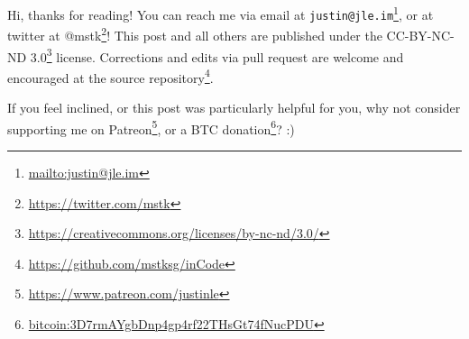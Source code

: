 \documentclass[]{article}
\renewcommand{\href}[2]{#2\footnote{\url{#1}}}
\begin{document}
Hi, thanks for reading! You can reach me via email at
\href{mailto:justin@jle.im}{\nolinkurl{justin@jle.im}}, or at twitter at
\href{https://twitter.com/mstk}{@mstk}! This post and all others are published
under the \href{https://creativecommons.org/licenses/by-nc-nd/3.0/}{CC-BY-NC-ND
3.0} license. Corrections and edits via pull request are welcome and encouraged
at \href{https://github.com/mstksg/inCode}{the source repository}.

If you feel inclined, or this post was particularly helpful for you, why not
consider \href{https://www.patreon.com/justinle}{supporting me on Patreon}, or a
\href{bitcoin:3D7rmAYgbDnp4gp4rf22THsGt74fNucPDU}{BTC donation}? :)
\end{document}
